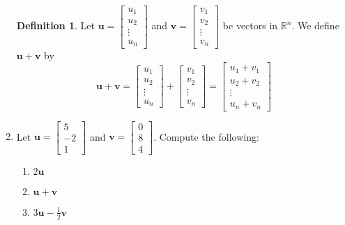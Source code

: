 \documentclass[12pt]{amsart}
\newcommand{\R}{\mathbb{R}}
\theoremstyle{definition}
\newtheorem*{definition}{Definition}
\begin{document}
\begin{enumerate}[itemsep=0.8em,leftmargin=0pt]
\begin{definition}
    Let $\mathbf{u}=\begin{bmatrix}
    u_1\\
    u_2\\
    \vdots\\
    u_n
    \end{bmatrix}$ and $\mathbf{v}=\begin{bmatrix}
    v_1\\
    v_2\\
    \vdots\\
    v_n
    \end{bmatrix}$ be vectors in $\R^n$.  We define $\mathbf{u}+\mathbf{v}$ by
      $$\mathbf{u}+\mathbf{v}=\begin{bmatrix}
    u_1\\
    u_2\\
    \vdots\\
    u_n
    \end{bmatrix}+\begin{bmatrix}
    v_1\\
    v_2\\
    \vdots\\
    v_n
    \end{bmatrix}=\begin{bmatrix}
    u_1+v_1\\
    u_2+v_2\\
    \vdots\\
    u_n+v_n
    \end{bmatrix}$$
\end{definition}


\item Let $\mathbf{u}=\left[\begin{array}{c} 5\\-2\\1 \end{array}\right]$ and $\mathbf{v}=\left[\begin{array}{c} 0\\8\\4 \end{array}\right]$. Compute the following:
\begin{enumerate}
    \item $2\mathbf{u}$
    \item $\mathbf{u}+\mathbf{v}$
    \item $3\mathbf{u}-\frac{1}{2}\mathbf{v}$ 
\end{enumerate}


\end{enumerate}
\end{document}
